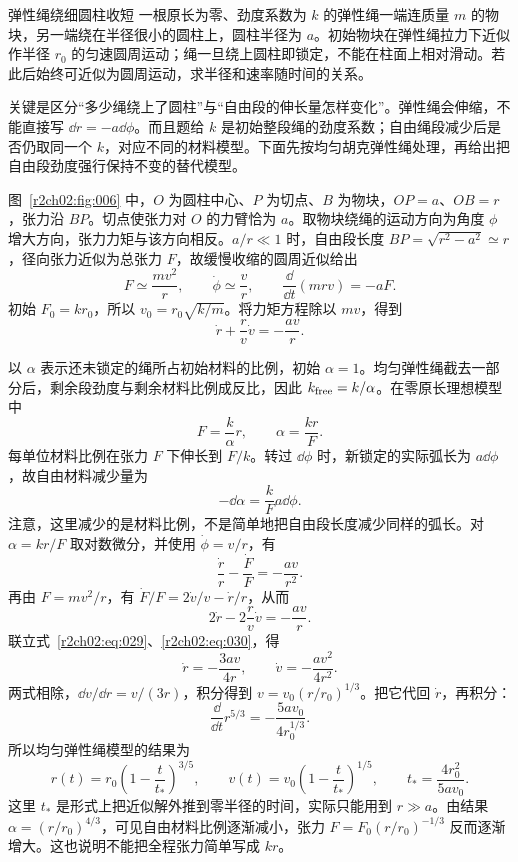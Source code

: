 \begin{practicebox}{弹性绳绕细圆柱收短}
一根原长为零、劲度系数为 $k$ 的弹性绳一端连质量 $m$ 的物块，另一端绕在半径很小的圆柱上，圆柱半径为 $a$。初始物块在弹性绳拉力下近似作半径 $r_0$ 的匀速圆周运动；绳一旦绕上圆柱即锁定，不能在柱面上相对滑动。若此后始终可近似为圆周运动，求半径和速率随时间的关系。
\label{r2ch02:pr:007}
\begin{solution}
关键是区分“多少绳绕上了圆柱”与“自由段的伸长量怎样变化”。弹性绳会伸缩，不能直接写 $\dd r=-a\dd\phi$。而且题给 $k$ 是初始整段绳的劲度系数；自由绳段减少后是否仍取同一个 $k$，对应不同的材料模型。下面先按均匀胡克弹性绳处理，再给出把自由段劲度强行保持不变的替代模型。

图~\ref{r2ch02:fig:006} 中，$O$ 为圆柱中心、$P$ 为切点、$B$ 为物块，$OP=a$、$OB=r$，张力沿 $BP$。切点使张力对 $O$ 的力臂恰为 $a$。取物块绕绳的运动方向为角度 $\phi$ 增大方向，张力力矩与该方向相反。$a/r\ll1$ 时，自由段长度 $BP=\sqrt{r^2-a^2}\simeq r$，径向张力近似为总张力 $F$，故缓慢收缩的圆周近似给出
\[
 F\simeq\frac{mv^2}{r},\qquad \dot\phi\simeq\frac vr,
 \qquad \frac{\dd}{\dd t}(mrv)=-aF.
\]
初始 $F_0=kr_0$，所以 $v_0=r_0\sqrt{k/m}$。将力矩方程除以 $mv$，得到
\begin{equation}
 \dot r+\frac r v\dot v=-\frac{av}{r}.
 \label{r2ch02:eq:029}
\end{equation}
\figElasticWinding

以 $\alpha$ 表示还未锁定的绳所占初始材料的比例，初始 $\alpha=1$。均匀弹性绳截去一部分后，剩余段劲度与剩余材料比例成反比，因此 $k_{\rm free}=k/\alpha$。在零原长理想模型中
\[
 F=\frac{k}{\alpha}r,\qquad \alpha=\frac{kr}{F}.
\]
每单位材料比例在张力 $F$ 下伸长到 $F/k$。转过 $\dd\phi$ 时，新锁定的实际弧长为 $a\dd\phi$，故自由材料减少量为
\[
 -\dd\alpha=\frac{k}{F}a\dd\phi.
\]
注意，这里减少的是材料比例，不是简单地把自由段长度减少同样的弧长。对 $\alpha=kr/F$ 取对数微分，并使用 $\dot\phi=v/r$，有
\[
 \frac{\dot r}{r}-\frac{\dot F}{F}=-\frac{av}{r^2}.
\]
再由 $F=mv^2/r$，有 $\dot F/F=2\dot v/v-\dot r/r$，从而
\begin{equation}
 2\dot r-2\frac r v\dot v=-\frac{av}{r}.
 \label{r2ch02:eq:030}
\end{equation}
联立式~\eqref{r2ch02:eq:029}、\eqref{r2ch02:eq:030}，得
\[
 \dot r=-\frac{3av}{4r},\qquad
 \dot v=-\frac{av^2}{4r^2}.
\]
两式相除，$\dd v/\dd r=v/(3r)$，积分得到
$v=v_0(r/r_0)^{1/3}$。把它代回 $\dot r$，再积分：
\[
 \frac{\dd}{\dd t}r^{5/3}
 =-\frac{5av_0}{4r_0^{1/3}}.
\]
所以均匀弹性绳模型的结果为
\[
 \boxed{r(t)=r_0\left(1-\frac{t}{t_*}\right)^{3/5}},\qquad
 \boxed{v(t)=v_0\left(1-\frac{t}{t_*}\right)^{1/5}},\qquad
 t_*=\frac{4r_0^2}{5av_0}.
\]
这里 $t_*$ 是形式上把近似解外推到零半径的时间，实际只能用到 $r\gg a$。由结果 $\alpha=(r/r_0)^{4/3}$，可见自由材料比例逐渐减小，张力 $F=F_0(r/r_0)^{-1/3}$ 反而逐渐增大。这也说明不能把全程张力简单写成 $kr$。


\end{solution}
\end{practicebox}
